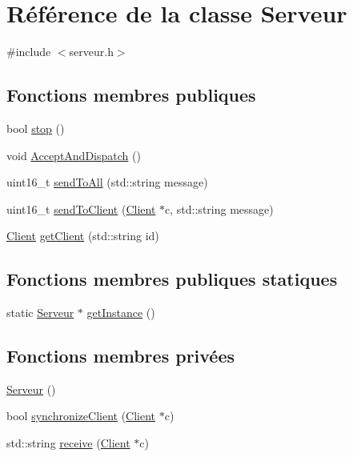 \hypertarget{classServeur}{\section{Référence de la classe Serveur}
\label{classServeur}
}


{\ttfamily \#include $<$serveur.\-h$>$}

\subsection*{Fonctions membres publiques}
\begin{DoxyCompactItemize}
\item 
bool \hyperlink{classServeur_a3f79c4ba0f58e4573709575cf8110459}{stop} ()
\item 
void \hyperlink{classServeur_a12d924e325b3fa6a65a4e70986114625}{Accept\-And\-Dispatch} ()
\item 
uint16\-\_\-t \hyperlink{classServeur_aa3084842ce1be2065239b1afcf384cc0}{send\-To\-All} (std\-::string message)
\item 
uint16\-\_\-t \hyperlink{classServeur_a5307c171fde619d6441ba9d89aaa3b1a}{send\-To\-Client} (\hyperlink{classClient}{Client} $\ast$c, std\-::string message)
\item 
\hyperlink{classClient}{Client} \hyperlink{classServeur_a8eed76b45aaa11b0a1f51ff133735dec}{get\-Client} (std\-::string id)
\end{DoxyCompactItemize}
\subsection*{Fonctions membres publiques statiques}
\begin{DoxyCompactItemize}
\item 
static \hyperlink{classServeur}{Serveur} $\ast$ \hyperlink{classServeur_af45129123392e1bee01b09201945aab1}{get\-Instance} ()
\end{DoxyCompactItemize}
\subsection*{Fonctions membres privées}
\begin{DoxyCompactItemize}
\item 
\hyperlink{classServeur_a8a7a1df15a07e095436dedd0d40a0196}{Serveur} ()
\item 
bool \hyperlink{classServeur_a01ac17dffbd9801773f89f033dfb7f0b}{synchronize\-Client} (\hyperlink{classClient}{Client} $\ast$c)
\item 
std\-::string \hyperlink{classServeur_ae4c196fb5ff5fffe40d480e5575570d9}{receive} (\hyperlink{classClient}{Client} $\ast$c)
\end{DoxyCompactItemize}
